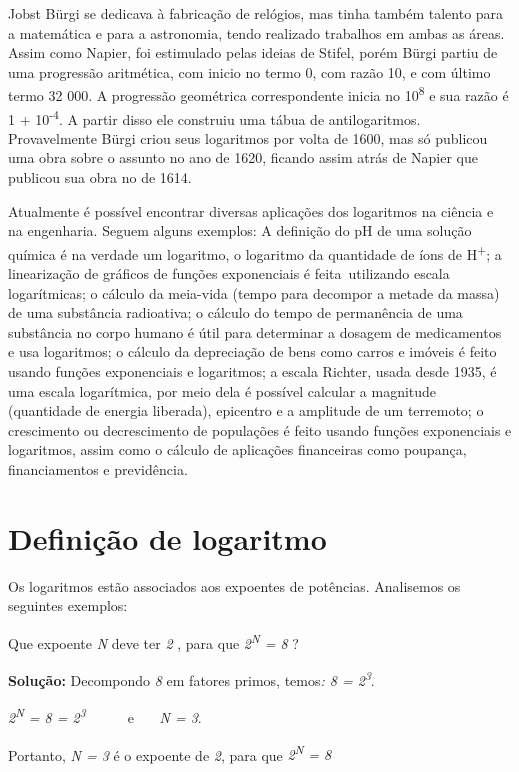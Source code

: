 Jobst Bürgi se dedicava à fabricação de relógios, mas tinha também talento para a matemática e para a astronomia, tendo realizado trabalhos em ambas as áreas. Assim como Napier, foi estimulado pelas ideias de Stifel, porém Bürgi partiu de uma progressão aritmética, com inicio no termo 0, com razão 10, e com último termo 32 000. A progressão geométrica correspondente inicia no 10\textsuperscript{8} e sua razão é 1 + 10\textsuperscript{-4}. A partir disso ele construiu uma tábua de antilogaritmos. Provavelmente Bürgi criou seus logaritmos por volta de 1600, mas só publicou uma obra sobre o assunto no ano de 1620, ficando assim atrás de Napier que publicou sua obra no de 1614.

Atualmente é possível encontrar diversas aplicações dos logaritmos na ciência e na engenharia. Seguem alguns exemplos: A definição do pH de uma solução química é na verdade um logaritmo, o logaritmo da quantidade de íons de H\textsuperscript{+}; a linearização de gráficos de funções exponenciais é feita~utilizando escala logarítmicas; o cálculo da meia-vida (tempo para decompor a metade da massa) de uma substância radioativa; o cálculo do tempo de permanência de uma substância no corpo humano é útil para determinar a  dosagem de medicamentos e usa logaritmos; o cálculo da depreciação de bens como carros e imóveis é feito usando funções exponenciais e logaritmos; a escala Richter, usada desde 1935, é uma escala logarítmica, por meio dela é possível calcular a magnitude (quantidade de energia liberada), epicentro e a amplitude de um terremoto; o crescimento ou decrescimento de populações é feito usando funções exponenciais e logaritmos, assim como o cálculo de aplicações financeiras como poupança, financiamentos e previdência.

\section{Definição de logaritmo}

Os logaritmos estão associados aos expoentes de potências. Analisemos os seguintes exemplos:

\begin{texemplo} 
    Que expoente \textit{N} deve ter \textit{2} , para que \textit{2\textsuperscript{N} = 8 } ? 

    \textbf{Solução:} Decompondo \textit{8} em fatores primos, temos\textit{: 8 = 2\textsuperscript{3}}. 

    \textit{2\textsuperscript{N} = 8 = 2\textsuperscript{3}}~~~~~~e~~~  \textit{N = 3}.

    Portanto, \textit{N = 3} é o expoente de \textit{2}, para que \textit{2\textsuperscript{N} = 8}\qedsymbol{}

\end{texemplo}

